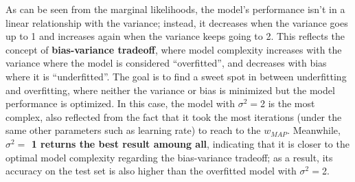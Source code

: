 \documentclass{article} %
\begin{document}
  As can be seen from the marginal likelihoods, the model's performance isn't in a linear relationship with the variance; instead, it decreases when the variance goes up to 1 and increases again when the variance keeps going to 2. This reflects the concept of \textbf{bias-variance tradeoff}, where model complexity increases with the variance where the model is considered ``overfitted'', and decreases with bias where it is ``underfitted''. The goal is to find a sweet spot in between underfitting and overfitting, where neither the variance or bias is minimized but the model performance is optimized. In this case, the model with $\sigma^2 =$2 is the most complex, also reflected from the fact that it took the most iterations (under the same other parameters such as learning rate) to reach to the $w_{MAP}$. Meanwhile, \textbf{$\sigma^2 =$ 1 returns the best result amoung all}, indicating that it is closer to the optimal model complexity regarding the bias-variance tradeoff; as a result, its accuracy on the test set is also higher than the overfitted model with $\sigma^2 =$2.
\end{document}

